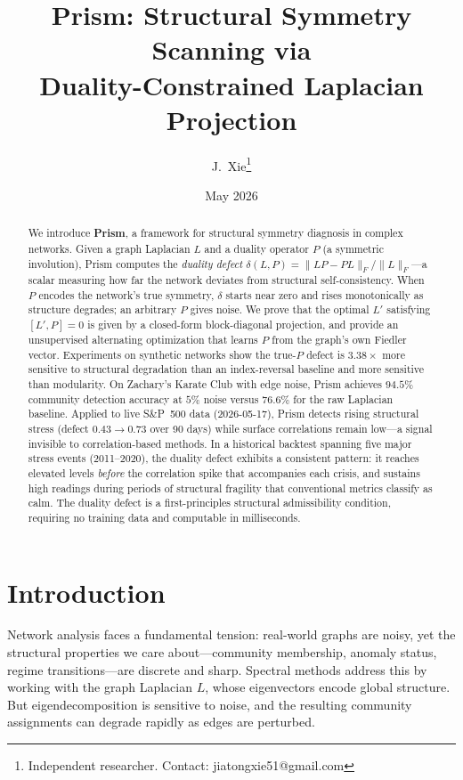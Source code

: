 \documentclass[11pt]{article}
\title{Prism: Structural Symmetry Scanning via\\
Duality-Constrained Laplacian Projection}
\author{J.~Xie\thanks{Independent researcher. Contact: jiatongxie51@gmail.com}}
\date{May 2026}
\begin{document}
\maketitle

\begin{abstract}
We introduce \textbf{Prism}, a framework for structural symmetry
diagnosis in complex networks.
Given a graph Laplacian $L$ and a duality operator $P$ (a symmetric
involution), Prism computes the \emph{duality defect}
$\delta(L,P) = \|LP - PL\|_F / \|L\|_F$---a scalar measuring how far
the network deviates from structural self-consistency.
When $P$ encodes the network's true symmetry, $\delta$ starts near zero
and rises monotonically as structure degrades; an arbitrary $P$ gives
noise.
We prove that the optimal $L'$ satisfying $[L', P] = 0$ is given by
a closed-form block-diagonal projection, and provide an unsupervised
alternating optimization that learns $P$ from the graph's own Fiedler
vector.
Experiments on synthetic networks show the true-$P$ defect is
$3.38\times$ more sensitive to structural degradation than an
index-reversal baseline and more sensitive than modularity.
On Zachary's Karate Club with edge noise, Prism achieves $94.5\%$
community detection accuracy at $5\%$ noise versus $76.6\%$ for the
raw Laplacian baseline.
Applied to live S\&P~500 data (2026-05-17), Prism detects rising
structural stress (defect $0.43 \to 0.73$ over 90 days) while surface
correlations remain low---a signal invisible to correlation-based
methods.
In a historical backtest spanning five major stress events (2011--2020),
the duality defect exhibits a consistent pattern: it reaches elevated
levels \emph{before} the correlation spike that accompanies each crisis,
and sustains high readings during periods of structural fragility that
conventional metrics classify as calm.
The duality defect is a first-principles structural admissibility
condition, requiring no training data and computable in milliseconds.
\end{abstract}

\section{Introduction}

Network analysis faces a fundamental tension: real-world graphs are noisy,
yet the structural properties we care about---community membership, anomaly
status, regime transitions---are discrete and sharp.
Spectral methods address this by working with the graph Laplacian $L$,
whose eigenvectors encode global structure.
But eigendecomposition is sensitive to noise, and the resulting community
assignments can degrade rapidly as edges are perturbed.
\end{document}
